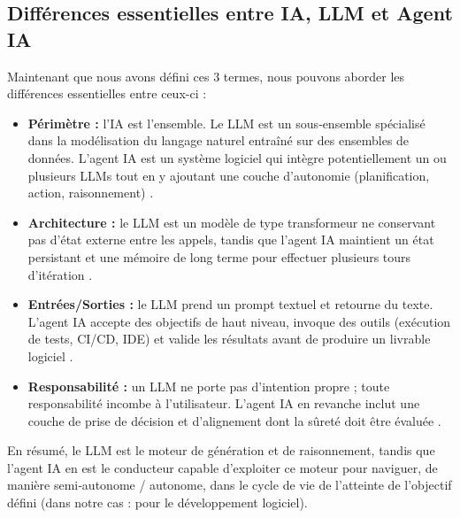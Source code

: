 %
%

\subsection{Différences essentielles entre IA, LLM et Agent IA}
Maintenant que nous avons défini ces 3 termes, nous pouvons aborder les différences essentielles entre ceux-ci :

\begin{itemize}
  \item \textbf{Périmètre :} l'IA est l’ensemble. Le LLM est un sous‑ensemble spécialisé dans la modélisation du langage naturel entraîné sur des ensembles de données. L'agent IA est un système logiciel qui intègre potentiellement un ou plusieurs LLMs tout en y ajoutant une couche d’autonomie (planification, action, raisonnement) \parencite{cui_risk_2024}.

  
  \item \textbf{Architecture :} le LLM est un modèle de type transformeur ne conservant pas d’état externe entre les appels, tandis que l’agent IA maintient un état persistant et une mémoire de long terme pour effectuer plusieurs tours d’itération \parencite{handler_taxonomy_2023}.

%
  \item \textbf{Entrées/Sorties :} le LLM prend un prompt textuel et retourne du texte.  L’agent IA accepte des objectifs de haut niveau, invoque des outils (exécution de tests, CI/CD, IDE) et valide les résultats avant de produire un livrable logiciel \parencite{rasheed_codepori_2024}.
  
  \item \textbf{Responsabilité :} un LLM ne porte pas d’intention propre ; toute responsabilité incombe à l’utilisateur.  L’agent IA en revanche inclut une couche de prise de décision et d’alignement dont la sûreté doit être évaluée \parencite{cui_risk_2024}.
\end{itemize}
\noindent En résumé, le LLM est le moteur de génération et de raisonnement, tandis que l’agent IA en est le conducteur capable d’exploiter ce moteur pour naviguer, de manière semi‑autonome / autonome, dans le cycle de vie de l'atteinte de l'objectif défini (dans notre cas : pour le développement logiciel).

